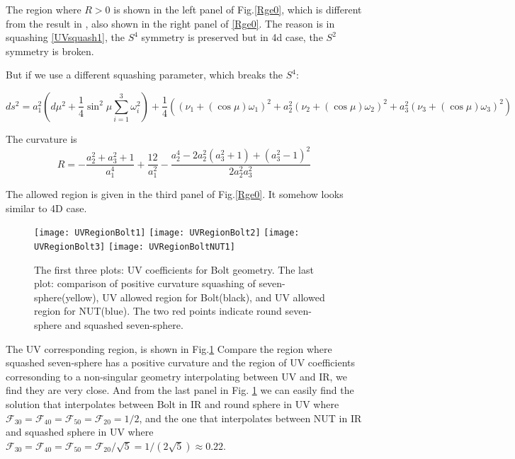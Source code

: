 \documentclass[12pt, a4paper]{article}
\numberwithin{equation}{section}
\newcommand{\be}{\begin{equation}}
\newcommand{\ee}{\end{equation}}
\newcommand{\cF}{\mathcal{F}}
\begin{document}
	The region where $R > 0$ is shown in the left panel of Fig.\ref{Rge0}, which is different from the result in \cite{Bobev:2016sh}, also shown in the right panel of \ref{Rge0}. The reason is in squashing \ref{UVsquash1}, the $S^4$ symmetry is preserved but in 4d case, the $S^2$ symmetry is broken. 
	
	But if we use a different squashing parameter, which breaks the $S^4$:
	
\be
	ds^2 = a_1^2 \left(d\mu^2 +\frac{1}{4}\sin^2\mu \sum\limits_{i=1}^3 \omega_i^2  \right) + \frac{1}{4}\left((\nu_1 + (\cos\mu)\omega_1)^2 +  a_2^2(\nu_2 + (\cos\mu)\omega_2)^2 +a_3^2(\nu_3 + (\cos\mu)\omega_3)^2\right)
\ee
	
	The curvature is
\be
	R = -\frac{a_2^2+a_3^2+1}{a_1^4}+\frac{12}{a_1^2}-\frac{a_2^4-2 a_2^2 \left(a_3^2+1\right)+\left(a_3^2-1\right)^2}{2 a_2^2 a_3^2}
\ee	
	
	The allowed region is given in the third panel of Fig.\ref{Rge0}. It somehow looks similar to 4D case.
	
	\begin{figure}[h]
		\texttt{[image: UVRegionBolt1]}
		\texttt{[image: UVRegionBolt2]}
		\texttt{[image: UVRegionBolt3]}
		\texttt{[image: UVRegionBoltNUT1]}
		\caption{{\rm The first three plots: UV coefficients for Bolt geometry. The last plot: comparison of positive curvature squashing of seven-sphere(yellow), UV allowed region for Bolt(black), and UV allowed region for NUT(blue). The two red points indicate round seven-sphere and squashed seven-sphere.}}
		\label{UVRegionBolt}
	\end{figure}	
		
The UV corresponding region, is shown in Fig.\ref{UVRegionBolt} Compare the region where squashed seven-sphere has a positive curvature and the region of UV coefficients corresonding to a non-singular geometry interpolating between UV and IR, we find they are very close.	And from the last panel in Fig. \ref{UVRegionBolt} we can easily find the solution that interpolates between Bolt in IR and round sphere in UV where $\cF_{30} = \cF_{40} = \cF_{50} = \cF_{20} = 1/2$, and the one that interpolates between NUT in IR and squashed sphere in UV where $\cF_{30} = \cF_{40} = \cF_{50} = \cF_{20}/\sqrt{5} = 1/(2\sqrt{5})\approx 0.22$.
		
\end{document}
